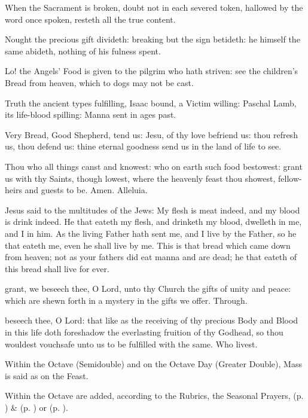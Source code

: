 When the Sacrament is broken, doubt not in each severed token, hallowed by the word once spoken, resteth all the true content.\par
Nought the precious gift divideth: breaking but the sign betideth: he himself the same abideth, nothing of his fulness spent.\par
Lo! the Angels' Food is given to the pilgrim who hath striven: see the children's Bread from heaven, which to dogs may not be cast.\par
Truth the ancient types fulfilling, Isaac bound, a Victim willing: Paschal Lamb, its life-blood spilling: Manna sent in ages past.\par
Very Bread, Good Shepherd, tend us: Jesu, of thy love befriend us: thou refresh us, thou defend us: thine eternal goodness send us in the land of life to see.\par
Thou who all things canst and knowest: who on earth such food bestowest: grant us with thy Saints, though lowest, where the heavenly feast thou showest, fellow-heirs and guests to be. Amen. Alleluia.


 Jesus said to the multitudes of the Jews: My flesh is meat indeed, and my blood is drink indeed. He that eateth my flesh, and drinketh my blood, dwelleth in me, and I in him. As the living Father hath sent me, and I live by the Father, so he that eateth me, even he shall live by me. This is that bread which came down from heaven; not as your fathers did eat manna and are dead; he that eateth of this bread shall live for ever.

\secret
{} grant, we beseech thee, O Lord, unto thy Church the gifts of unity and peace: which are shewn forth in a mystery in the gifts we offer. Through.


\postcommunion
{} beseech thee, O Lord: that like as the receiving of thy precious Body and Blood in this life doth foreshadow the everlasting fruition of thy Godhead, so thou wouldest vouchsafe unto us to be fulfilled with the same. Who livest.
\begin{rubric}
    Within the Octave (Semidouble) and on the Octave Day (Greater Double), Mass is said as on the Feast.
\end{rubric}
\begin{rubric}
    Within the Octave are added, according to the Rubrics, the Seasonal Prayers,   (p. \pageref{SPMaryInEaster}) \&   (p. \pageref{SPAgainst}) or  (p. \pageref{SPChiefBishop}).
\end{rubric}


